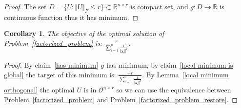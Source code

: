\documentclass{article}
\newtheorem{corollary}{Corollary}
\newtheorem{lemma}[theorem]{Lemma}
\newcommand{\probref}[1]{Problem~\ref{#1}}
\newcommand{\claimref}[1]{claim~\ref{#1}}
\newcommand{\Lemmaref}[1]{Lemma~\ref{#1}}
\newcommand{\x}{{\mathbf x}}
\begin{document}
\begin{proof}
    The set $D=\{U:\Vert U\Vert_F\le r\}\subset\mathbb{R}^{n\times r}$ is compact set, and $g:D\rightarrow\mathbb{R}$ is continuous function thus it has minimum. 
\end{proof}

\begin{corollary} \label{tagrget of original problem}
The objective of the optimal solution of \probref{factorized_problem} is: $\frac{r}{\sum_{i=1}^n \frac{1}{\left\Vert\x_{i}\right\Vert^{2}}}$.
\end{corollary}

\begin{proof}
    By \claimref{has minimum} $g$ has minimum, by \claimref{local minimum is global} the target of this minimum is: $\frac{-r}{\sum_{i=1}^n \frac{1}{\left\Vert\x_{i}\right\Vert^{2}}}$. By \Lemmaref{local minimum orthogonal} the optimal $U$ is in $\mathcal{O}^{n\times r}$ so we can use the equivalence between \probref{factorized_problem} and \probref{factorized_problem_restore}.
    
\end{proof}

\end{document}

